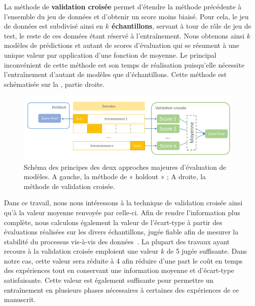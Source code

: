 La méthode de \textbf{validation croisée} permet d'étendre la méthode précédente à l'ensemble du jeu de données et d'obtenir un score moins biaisé. Pour cela, le jeu de données est subdivisé ainsi en \textbf{$k$ échantillons}, servant à tour de rôle de jeu de test, le reste de ces données étant réservé à l'entraînement. Nous obtenons ainsi $k$ modèles de prédictions et autant de scores d'évaluation qui se résument à une unique valeur par application d'une fonction de moyenne. Le principal inconvénient de cette méthode est son temps de réalisation puisqu'elle nécessite l'entraînement d'autant de modèles que d'échantillons. Cette méthode est schématisée sur la , partie droite.\par

\begin{figure}[H]
    \centering
    \includegraphics[width=\textwidth]{contents/chapter_3/resources/scheme_holdout_cv.pdf}
    \caption{Schéma des principes des deux approches majeures d'évaluation de modèles. A gauche, la méthode de « holdout » ; A droite, la méthode de validation croisée.}
    \label{fig:scheme_holdout_cv}
\end{figure}

Dans ce travail, nous nous intéressons à la technique de validation croisée ainsi qu'à la valeur moyenne renvoyée par celle-ci. Afin de rendre l'information plus complète, nous calculons également la valeur de l'écart-type à partir des évaluations réalisées sur les divers échantillons, jugée fiable afin de mesurer la stabilité du processus vis-à-vis des données~\cite{Kim2009}. La plupart des travaux ayant recours à la validation croisée emploient une valeur $k$ de 5 jugée suffisante. Dans notre cas, cette valeur sera réduite à 4 afin réduire d'une part le coût en temps des expériences tout en conservant une information moyenne et d'écart-type satisfaisante. Cette valeur est également suffisante pour permettre un entraînement en plusieurs phases nécessaires à certaines des expériences de ce manuscrit.\par

